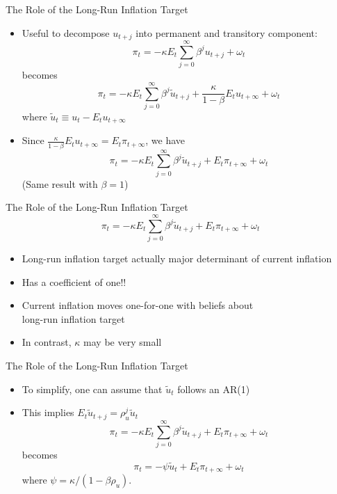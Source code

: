 \documentclass[10pt]{beamer}
\begin{document}
\begin{frame}{The Role of the Long-Run Inflation Target}
	\begin{itemize}
		\item Useful to decompose $u_{t+j}$ into permanent and transitory component:
		\[\pi_{t}=-\kappa E_{t}\sum_{j=0}^{\infty}\beta^{j} u_{t+j} + \omega_{t}\]
		becomes
		\[\pi_{t}=-\kappa E_{t}\sum_{j=0}^{\infty}\beta^{j}\tilde{u}_{t+j} + \frac{\kappa}{1-\beta}E_{t} u_{t+\infty} + \omega_{t}\]
		where $\tilde{u}_{t}\equiv u_{t}- E_{t}u_{t+\infty}$
		\item Since $\frac{\kappa}{1-\beta} E_{t}u_{t+\infty}=E_{t}\pi_{t+\infty}$, we have
		\[\pi_{t}=-\kappa E_{t}\sum_{j=0}^{\infty}\beta^{j}\tilde{u}_{t+j} + E_{t}\pi_{t+\infty} + \omega_{t}\]
		(Same result with $\beta = 1$)
	\end{itemize}
\end{frame}


\begin{frame}{The Role of the Long-Run Inflation Target}
	\[\pi_{t}=-\kappa E_{t}\sum_{j=0}^{\infty}\beta^{j}\tilde{u}_{t+j} + E_{t}\pi_{t+\infty} + \omega_{t}\]
		\begin{itemize}
		\itemsep1em 
		\item Long-run inflation target actually major determinant of current inflation
		\item Has a coefficient of one!!
		\item Current inflation moves one-for-one with beliefs about \\ long-run inflation target
		\item In contrast, $\kappa$ may be very small
	\end{itemize}
\end{frame}


\begin{frame}{The Role of the Long-Run Inflation Target}
	\begin{itemize}
		\itemsep1em 
		\item To simplify, one can assume that $\tilde{u}_t$ follows an AR(1)
		\item This implies $E_t \tilde{u}_{t+j} = \rho^j_u \tilde{u}_{t}$
		\[\pi_{t}=-\kappa E_{t}\sum_{j=0}^{\infty}\beta^{j}\tilde{u}_{t+j} + E_{t}\pi_{t+\infty} + \omega_{t}\]
		becomes
		\[ \pi_{t} = - \psi \tilde{u}_{t} + E_{t}\pi_{t+\infty} + \omega_t\]
		where $\psi = \kappa / (1-\beta\rho_{u})$. 
	\end{itemize}
\end{frame}
\end{document}
